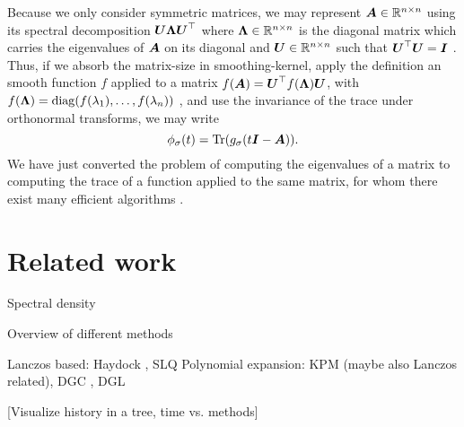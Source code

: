 Because we only consider symmetric matrices, 
we may represent $\boldsymbol{A} \in \mathbb{R}^{n \times n}$ using its spectral
decomposition $\boldsymbol{U} \boldsymbol{\Lambda} \boldsymbol{U}^{\top}$ where
$\boldsymbol{\Lambda} \in \mathbb{R}^{n \times n}$ is the diagonal matrix which carries
the eigenvalues of $\boldsymbol{A}$ on its diagonal and $\boldsymbol{U} \in \mathbb{R}^{n \times n}$
such that $\boldsymbol{U}^{\top} \boldsymbol{U} = \boldsymbol{I}$ \cite[Theorem~4.1.5]{horn1985matrix}.
Thus, if we absorb the \gls{matrix-size} in \gls{smoothing-kernel},
apply the definition an smooth function $f$ applied to a matrix $f(\boldsymbol{A}) = \boldsymbol{U}^{\top} f(\boldsymbol{\Lambda}) \boldsymbol{U}$,
with $f(\boldsymbol{\Lambda}) = \operatorname{diag}(f(\lambda_1), \dots, f(\lambda_n))$ \cite[Definition~1.2]{higham2008functions},
and use the invariance of the trace under orthonormal transforms, we may write
\begin{equation}
    \phi_{\sigma}(t) = \operatorname{Tr}(g_{\sigma}(t\boldsymbol{I} - \boldsymbol{A})).
    \label{equ:1-introduction-spectral-density-as-trace}
\end{equation}
We have just converted the problem of computing the eigenvalues of a matrix to 
computing the trace of a function applied to the same matrix, for whom
there exist many efficient algorithms .


\section{Related work}
\label{sec:1-introduction-related}

Spectral density \cite{lin2017randomized}

Overview of different methods 

Lanczos based: Haydock \cite{lin2016review}, SLQ \cite{chen2021slq}
Polynomial expansion: KPM \cite{weisse2006kpm} (maybe also Lanczos related), DGC \cite{lin2017randomized}, DGL \cite{lin2016review}

[Visualize history in a tree, time vs. methods]


